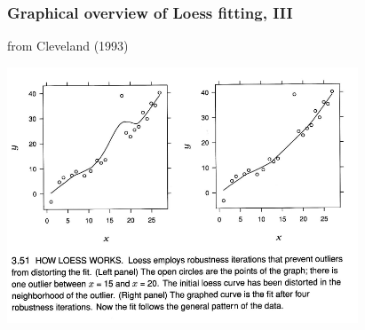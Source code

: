 \documentclass{beamer}
\begin{document}
\begin{frame}
  \frametitle{Graphical overview of Loess fitting, III}  

{\tiny from Cleveland (1993)}
\begin{center}
\includegraphics[height=3in]{loess3.pdf}
\end{center}  

\end{frame}
\end{document}
